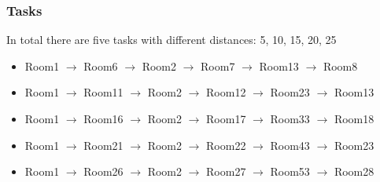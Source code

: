 \documentclass{beamer}
\begin{document}
\begin{frame}
  \frametitle{Tasks}
  In total there are five tasks with different distances: 5, 10, 15, 20, 25
  \begin{itemize}
    \item Room1 $\rightarrow$ Room6 $\rightarrow$ Room2 $\rightarrow$ Room7 $\rightarrow$ Room13 $\rightarrow$ Room8
    \item Room1 $\rightarrow$ Room11 $\rightarrow$ Room2 $\rightarrow$ Room12 $\rightarrow$ Room23 $\rightarrow$ Room13
    \item Room1 $\rightarrow$ Room16 $\rightarrow$ Room2 $\rightarrow$ Room17 $\rightarrow$ Room33 $\rightarrow$ Room18
    \item Room1 $\rightarrow$ Room21 $\rightarrow$ Room2 $\rightarrow$ Room22 $\rightarrow$ Room43 $\rightarrow$ Room23
    \item Room1 $\rightarrow$ Room26 $\rightarrow$ Room2 $\rightarrow$ Room27 $\rightarrow$ Room53 $\rightarrow$ Room28
  \end{itemize}
\end{frame}
\end{document}
